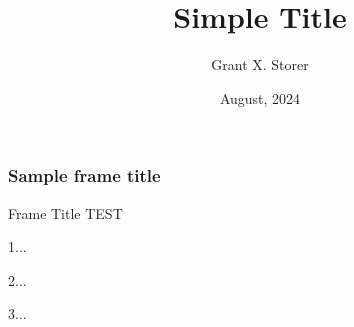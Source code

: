 \documentclass{beamer}
\title{Simple Title}
\author{Grant X. Storer}
\institute{Inter-American Development Bank}
\date{August, 2024}
\begin{document}
\frame{\titlepage}

\begin{frame}
    \frametitle{Sample frame title}

    \blindtext
\end{frame}

\begin{frame}{Frame Title}
    TEST 

    1...

    2...

    3...
\end{frame}
\end{document}
